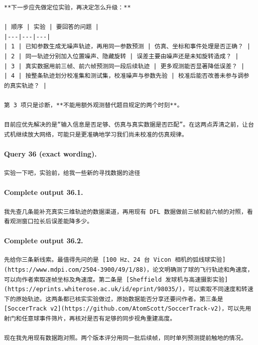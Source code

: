 \documentclass[UTF8,10pt]{ctexart}
\begin{document}
\begin{Verbatim}[breaklines=true,breakanywhere=true,fontsize=\scriptsize,frame=single,framesep=2pt]
**下一步应先做定位实验，再决定怎么升级：**

| 顺序 | 实验 | 要回答的问题 |
|---|---|---|
| 1 | 已知参数生成无噪声轨迹，再用同一参数预测 | 仿真、坐标和事件处理是否正确？ |
| 2 | 同一轨迹分别加入位置噪声、隐藏旋转 | 误差主要由噪声还是未知旋转造成？ |
| 3 | 真实数据用前三帧、前六帧预测同一段后续轨迹 | 更多观测能否显著降低误差？ |
| 4 | 按整条轨迹划分校准集和测试集，校准噪声与参数先验 | 校准后能否改善未参与调参的真实轨迹？ |

第 3 项只是诊断，**不能用额外观测替代题目规定的两个时刻**。

目前应优先解决的是“输入信息是否足够、仿真与真实数据是否匹配”。在这两点弄清之前，让台式机继续放大网络，可能只是更准确地学习我们尚未校准的仿真规律。
\end{Verbatim}

\paragraph{Query 36 (exact wording).}
\begin{Verbatim}[breaklines=true,breakanywhere=true,fontsize=\scriptsize,frame=single,framesep=2pt]
实验一下吧，实验前，给我一些新的寻找数据的途径
\end{Verbatim}

\paragraph{Complete output 36.1.}
\begin{Verbatim}[breaklines=true,breakanywhere=true,fontsize=\scriptsize,frame=single,framesep=2pt]
我先查几条能补充真实三维轨迹的数据渠道，再用现有 DFL 数据做前三帧和前六帧的对照，看看观测窗口拉长后误差能降多少。
\end{Verbatim}

\paragraph{Complete output 36.2.}
\begin{Verbatim}[breaklines=true,breakanywhere=true,fontsize=\scriptsize,frame=single,framesep=2pt]
先给你三条新线索。最值得先问的是 [100 Hz、24 台 Vicon 相机的弧线球实验](https://www.mdpi.com/2504-3900/49/1/88)，论文明确测了球的飞行轨迹和角速度，可以向作者索取逐帧坐标及角速度。第二条是 [Sheffield 发球机与高速摄影实验](https://eprints.whiterose.ac.uk/id/eprint/98035/)，可以索取不同速度和转速下的原始轨迹。这两条都已核实实验做过，原始数据能否分享还要问作者。第三条是 [SoccerTrack v2](https://github.com/AtomScott/SoccerTrack-v2)，可以先用射门和任意球事件筛片，再核对是否有足够的同步视角重建高度。

现在我先用现有数据跑对照。两个版本评分用同一批后续帧，同时单列预测提前触地的情况。
\end{Verbatim}
\end{document}
